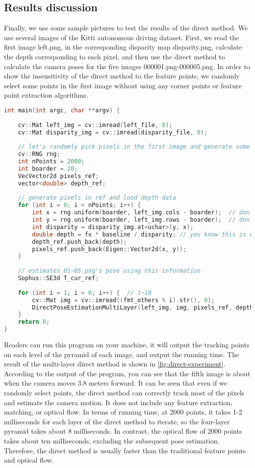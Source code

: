 {\subsection{Results discussion}
Finally, we use some sample pictures to test the results of the direct method. We use several images of the Kitti\textsubscript{\cite{Geiger2013}} autonomous driving dataset. First, we read the first image left.png, in the corresponding disparity map disparity.png, calculate the depth corresponding to each pixel, and then use the direct method to calculate the camera poses for the five images 000001.png-000005.png. In order to show the insensitivity of the direct method to the feature points, we randomly select some points in the first image without using any corner points or feature point extraction algorithms.
\begin{lstlisting}[language=c++,caption=slambook2/ch8/direct_method.cpp (snippet)]
int main(int argc, char **argv) {
	
	cv::Mat left_img = cv::imread(left_file, 0);
	cv::Mat disparity_img = cv::imread(disparity_file, 0);
	
	// let's randomly pick pixels in the first image and generate some 3d points in the first image's frame
	cv::RNG rng;
	int nPoints = 2000;
	int boarder = 20;
	VecVector2d pixels_ref;
	vector<double> depth_ref;
	
	// generate pixels in ref and load depth data
	for (int i = 0; i < nPoints; i++) {
		int x = rng.uniform(boarder, left_img.cols - boarder);  // don't pick pixels close to boarder
		int y = rng.uniform(boarder, left_img.rows - boarder);  // don't pick pixels close to boarder
		int disparity = disparity_img.at<uchar>(y, x);
		double depth = fx * baseline / disparity; // you know this is disparity to depth
		depth_ref.push_back(depth);
		pixels_ref.push_back(Eigen::Vector2d(x, y));
	}
	
	// estimates 01~05.png's pose using this information
	Sophus::SE3d T_cur_ref;
	
	for (int i = 1; i < 6; i++) {  // 1~10
		cv::Mat img = cv::imread((fmt_others % i).str(), 0);
		DirectPoseEstimationMultiLayer(left_img, img, pixels_ref, depth_ref, T_cur_ref);
	}
	return 0;
}
\end{lstlisting}

Readers can run this program on your machine, it will output the tracking points on each level of the pyramid of each image, and output the running time. The result of the multi-layer direct method is shown in \autoref{fig:direct-experiment}. According to the output of the program, you can see that the fifth image is about when the camera moves 3.8 meters forward. It can be seen that even if we randomly select points, the direct method can correctly track most of the pixels and estimate the camera motion. It does not include any feature extraction, matching, or optical flow. In terms of running time, at 2000 points, it takes 1-2 milliseconds for each layer of the direct method to iterate, so the four-layer pyramid takes about 8 milliseconds. In contrast, the optical flow of 2000 points takes about ten milliseconds, excluding the subsequent pose estimation. Therefore, the direct method is usually faster than the traditional feature points and optical flow.

}
